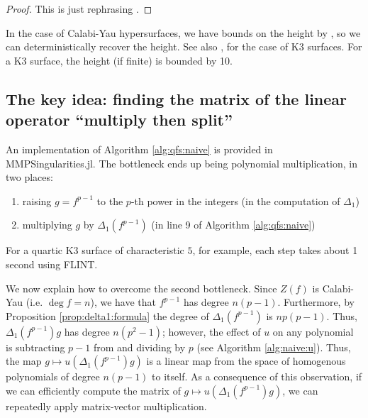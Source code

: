 \begin{proof}
	This is just rephrasing \cite[Theorem~C]{kty-2022-fedder}.
\end{proof}

In the case of Calabi-Yau hypersurfaces, we have bounds on the height by
\cite{van-der-geer-katsura-2003-calabi-yau},
so we can deterministically recover the height.  
See also \cite[Theorem~0.1]{artin-1974-k3-surfaces},
for the case of K3 surfaces.
For a K3 surface, the height (if finite) is bounded by 10.

\subsection{The key idea: finding the matrix of the linear operator ``multiply then split''}

An implementation of Algorithm \ref{alg:qfs:naive}
is provided in MMPSingularities.jl.
The bottleneck ends up being polynomial multiplication, 
in two places:
\begin{enumerate}[(1)]
    \item raising \(g = f^{p-1}\) to the \(p\)-th power in the integers
        (in the computation of \(\Delta_{1}\))
    \item multiplying \(g\) by \(\Delta_{1}(f^{p-1})\) 
        (in line 9 of Algorithm \ref{alg:qfs:naive})
\end{enumerate}

\noindent For a quartic K3 surface of characteristic \(5\),
for example, each step takes about 1 second 
using FLINT. 

%

We now explain how to overcome the second
bottleneck. Since \(Z(f)\) is Calabi-Yau
(i.e. \(\deg f = n\)), we have that \(f^{p-1}\) has degree
\(n(p-1)\). 
Furthermore, by Proposition \ref{prop:delta1:formula}
the degree of \(\Delta_{1}(f^{p-1})\) 
is \(np(p - 1)\).
Thus, \(\Delta_{1}(f^{p-1})g\) has degree
\(n(p^{2} - 1)\); however, the effect 
of \(u\) on any polynomial is subtracting \(p-1\)
from and dividing by \(p\) 
(see Algorithm \ref{alg:naive:u}).
Thus, the map 
\(g \mapsto u(\Delta_{1}(f^{p-1}) g)\) 
is a linear map from 
the space of homogenous polynomials of degree \(n(p-1)\) 
to itself.
As a consequence of this observation,
if we can efficiently compute the matrix of 
\(g \mapsto u(\Delta_{1}(f^{p-1})g)\),
we can repeatedly apply matrix-vector multiplication.

